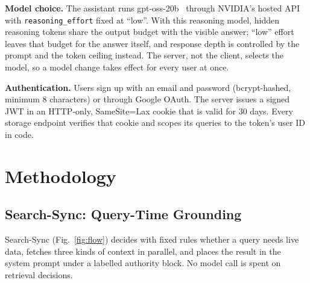 \documentclass[conference]{IEEEtran}
\newcommand{\code}[1]{\texttt{\small #1}}
\begin{document}
\textbf{Model choice.} The assistant runs gpt-oss-20b~\cite{openai2025gptoss} through NVIDIA's hosted API with \code{reasoning\_effort} fixed at ``low''. With this reasoning model, hidden reasoning tokens share the output budget with the visible answer; ``low'' effort leaves that budget for the answer itself, and response depth is controlled by the prompt and the token ceiling instead. The server, not the client, selects the model, so a model change takes effect for every user at once.

\textbf{Authentication.} Users sign up with an email and password (bcrypt-hashed, minimum 8 characters) or through Google OAuth. The server issues a signed JWT in an HTTP-only, SameSite=Lax cookie that is valid for 30 days. Every storage endpoint verifies that cookie and scopes its queries to the token's user ID in code.

\section{Methodology}
\label{sec:method}

\subsection{Search-Sync: Query-Time Grounding}

Search-Sync (Fig.~\ref{fig:flow}) decides with fixed rules whether a query needs live data, fetches three kinds of context in parallel, and places the result in the system prompt under a labelled authority block. No model call is spent on retrieval decisions.
\end{document}
